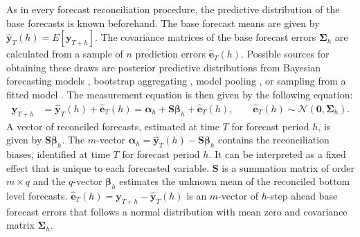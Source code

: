 \documentclass[a4paper,fleqn,11pt]{article}
\begin{document}
As in every forecast reconciliation procedure, the predictive distribution of the base forecasts is known beforehand. The base forecast means are given by $\mathbf{\hat{y}}_{T}(h) = E\left[\mathbf{y}_{T+h}\right]$. The covariance matrices of the base forecast errors $\boldsymbol{\Sigma}_h$ are calculated from a sample of $n$ prediction errors $\mathbf{\hat{e}}_{T}(h)$. Possible sources for obtaining these draws are posterior predictive distributions from Bayesian forecasting models \citep{Cesur2016}, bootstrap aggregating \citep{Bergmeir2016}, model pooling \citep{Timmermann2006,Kapetanios2015}, or sampling from a fitted model \citep{Hyndman2018}. The measurement equation is then given by the following equation:
\begin{align}
\label{eq:main}
\textbf{y}_{T+h} & = \mathbf{\hat{y}}_{T}(h) + \mathbf{\hat{e}}_{T}(h) = \boldsymbol{\alpha}_h + \textbf{S} \boldsymbol{\beta}_h + \mathbf{\hat{e}}_{T}(h), \qquad \mathbf{\hat{e}}_{T}(h) \sim \mathcal{N}(\textbf{0}, \boldsymbol{\Sigma}_h).
\end{align}
A vector of reconciled forecasts, estimated at time $T$ for forecast period $h$, is given by $\textbf{S} \boldsymbol{\beta}_h$. The $m$-vector $\boldsymbol{\alpha}_h = \mathbf{\hat{y}}_{T}(h) - \textbf{S} \boldsymbol{\beta}_h$ contains the reconciliation biases, identified at time $T$ for forecast period $h$. It can be interpreted as a fixed effect that is unique to each forecasted variable. $\textbf{S}$ is a summation matrix of order $m \times q$ and the $q$-vector $\boldsymbol{\beta}_h$ estimates the unknown mean of the reconciled bottom level forecasts.  $\mathbf{\hat{e}}_{T}(h) = \textbf{y}_{T+h} - \mathbf{\hat{y}}_{T}(h)$ is an $m$-vector of $h$-step ahead base forecast errors that follows a normal distribution with mean zero and covariance matrix $\boldsymbol{\Sigma}_h$.
\end{document}
